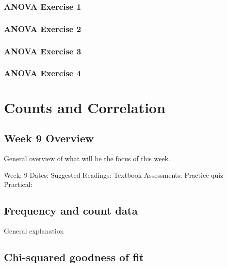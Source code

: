 \documentclass[
]{scrbook}
\begin{document}
\hypertarget{anova-exercise-1}{%
\section{ANOVA Exercise 1}\label{anova-exercise-1}}

\hypertarget{anova-exercise-2}{%
\section{ANOVA Exercise 2}\label{anova-exercise-2}}

\hypertarget{anova-exercise-3}{%
\section{ANOVA Exercise 3}\label{anova-exercise-3}}

\hypertarget{anova-exercise-4}{%
\section{ANOVA Exercise 4}\label{anova-exercise-4}}

\hypertarget{part-counts-and-correlation}{%
\part{Counts and Correlation}\label{part-counts-and-correlation}}

\hypertarget{Week9}{%
\chapter*{Week 9 Overview}\label{Week9}}

General overview of what will be the focus of this week.

Week: 9
Dates:
Suggested Readings: Textbook
Assessments: Practice quiz
Practical:

\hypertarget{frequency-and-count-data}{%
\chapter{Frequency and count data}\label{frequency-and-count-data}}

General explanation

\hypertarget{chi-squared-goodness-of-fit}{%
\chapter{Chi-squared goodness of fit}\label{chi-squared-goodness-of-fit}}
\end{document}
